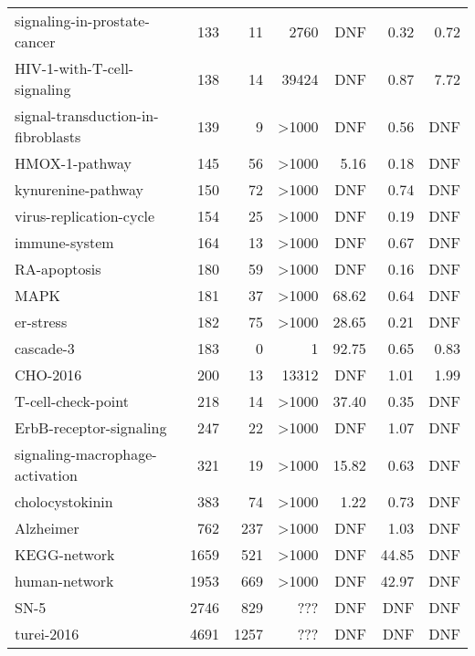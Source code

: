 \documentclass[runningheads]{llncs}
\begin{document}
\begin{table}[!htb]
\begin{tabular}{lrrrrrr}
    signaling-in-prostate-cancer~\cite{Montagud2021} & 133 & 11 & 2760 & DNF & 0.32 & 0.72\\
    HIV-1-with-T-cell-signaling~\cite{DBLP:journals/bmcsb/HelikarKMBRMWSLR12} & 138 & 14 & 39424 & DNF & 0.87 & 7.72\\
    signal-transduction-in-fibroblasts~\cite{helikar2008emergent} & 139 & 9 & >1000 & DNF & 0.56 & DNF\\
    HMOX-1-pathway~\cite{ostaszewski2021covid19} & 145 & 56 & >1000 & 5.16 & 0.18 & DNF\\
    kynurenine-pathway~\cite{ostaszewski2021covid19} & 150 & 72 & >1000 & DNF & 0.74 & DNF\\
    virus-replication-cycle~\cite{ostaszewski2021covid19} & 154 & 25 & >1000 & DNF & 0.19 & DNF\\
    immune-system~\cite{DBLP:journals/bmcsb/HelikarKMBRMWSLR12} & 164 & 13 & >1000 & DNF & 0.67 & DNF\\
    RA-apoptosis~\cite{aghamiri2020automated} & 180 & 59 & >1000 & DNF & 0.16 & DNF\\
    MAPK~\cite{aghamiri2020automated} & 181 & 37 & >1000 & 68.62 & 0.64 & DNF\\
    er-stress~\cite{ostaszewski2021covid19} & 182 & 75 & >1000 & 28.65 & 0.21 & DNF\\
    cascade-3~\cite{Tsirvouli2020} & 183 & 0 & 1 & 92.75 &  0.65 & 0.83\\
    CHO-2016~\cite{lee2019signal} & 200 & 13 & 13312 & DNF & 1.01 & 1.99\\
    T-cell-check-point~\cite{hernandez2020computational} & 218 & 14 & >1000 & 37.40 & 0.35 & DNF\\
    ErbB-receptor-signaling~\cite{helikar2013comprehensive} & 247 & 22 & >1000 & DNF & 1.07 & DNF\\
    signaling-macrophage-activation~\cite{DBLP:journals/bmcsb/HelikarKMBRMWSLR12} & 321 & 19 & >1000 & 15.82 & 0.63 & DNF\\
    cholocystokinin~\cite{aghamiri2020automated} & 383 & 74 & >1000 & 1.22 & 0.73 & DNF\\
    Alzheimer~\cite{aghamiri2020automated} & 762 & 237 & >1000 & DNF & 1.03 & DNF\\ \midrule
    KEGG-network~\cite{DBLP:journals/bmcsb/Kwon16} & 1659 & 521 & >1000 & DNF & 44.85 & DNF\\
    human-network~\cite{kim2011reduction} & 1953 & 669 & >1000 & DNF & 42.97 & DNF\\
    SN-5~\cite{kim2013rmod} & 2746 & 829 & ??? & DNF & DNF & DNF\\
    turei-2016~\cite{lee2019signal} & 4691 & 1257 & ??? & DNF & DNF & DNF\\
    \bottomrule
  \end{tabular}
\end{table}
\end{document}
